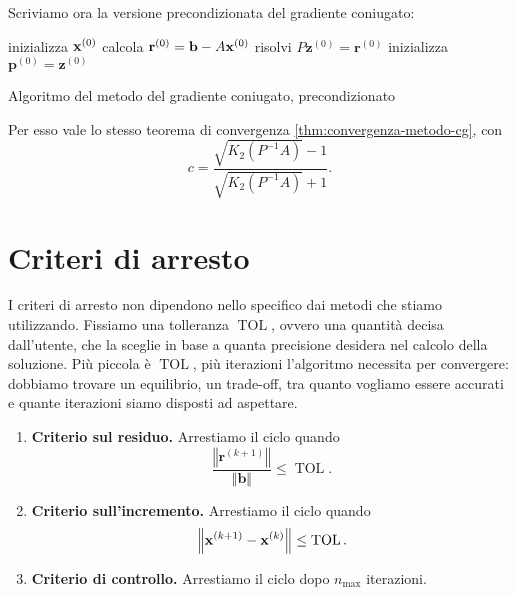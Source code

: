 Scriviamo ora la versione precondizionata del gradiente coniugato: \\
\begin{algo}
	inizializza $\mathbf{x}^{(0)}$\;
	calcola $\mathbf{r}^{(0)} =\mathbf{b} -A\mathbf{x}^{(0)}$\;
	risolvi $P\mathbf{z}^{(0)} = \mathbf{r}^{(0)}$\;
	inizializza $\mathbf{p}^{(0)} = \mathbf{z}^{(0)}$\;
	\caption{Algoritmo del metodo del gradiente coniugato, precondizionato}
\end{algo}
Per esso vale lo stesso teorema di convergenza \ref{thm:convergenza-metodo-cg}, con
\begin{equation*}
c=\frac{\sqrt{K_{2}\left( P^{-1} A\right)} -1}{\sqrt{K_{2}\left( P^{-1} A\right)} +1}.
\end{equation*}
\section{Criteri di arresto}

I criteri di arresto non dipendono nello specifico dai metodi che stiamo utilizzando. Fissiamo una tolleranza $\operatorname{TOL}$, ovvero una quantità decisa dall'utente, che la sceglie in base a quanta precisione desidera nel calcolo della soluzione.
Più piccola è $\operatorname{TOL}$, più iterazioni l'algoritmo necessita per convergere: dobbiamo trovare un equilibrio, un trade-off, tra quanto vogliamo essere accurati e quante iterazioni siamo disposti ad aspettare.
\begin{enumerate}
\item \textbf{Criterio sul residuo.} Arrestiamo il ciclo quando
\begin{equation*}
\frac{\left\Vert \mathbf{r}^{( k+1)}\right\Vert }{\Vert \mathbf{b}\Vert } \leqslant \operatorname{TOL}.
\end{equation*}
\item \textbf{Criterio sull'incremento.} Arrestiamo il ciclo quando
\begin{equation*}
\left\Vert \mathbf{x}^{( k+1)} -\mathbf{x}^{(k)}\right\Vert \leq \operatorname{TOL}.
\end{equation*}
\item \textbf{Criterio di controllo.} Arrestiamo il ciclo dopo $n_{\text{max}}$ iterazioni.
\end{enumerate}

